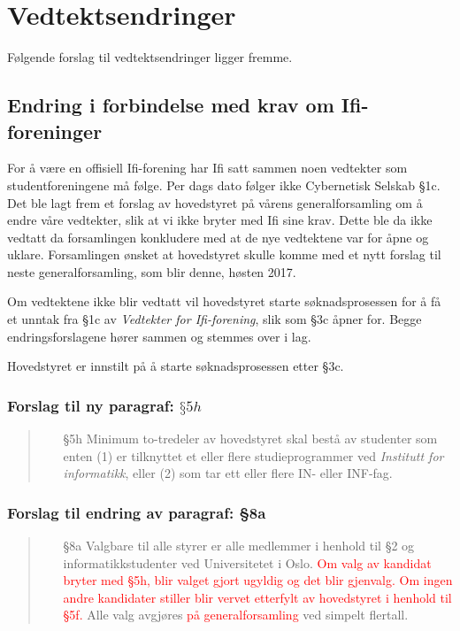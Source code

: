 \documentclass[10pt,norsk,a4paper]{article}
\begin{document}
\newpage

\section{Vedtektsendringer}
Følgende forslag til vedtektsendringer ligger fremme.

\subsection{Endring i forbindelse med krav om Ifi-foreninger}

For å være en offisiell Ifi-forening har Ifi satt sammen noen vedtekter som studentforeningene må følge.
Per dags dato følger ikke Cybernetisk Selskab §1c\footnotemark. Det ble lagt frem et forslag av hovedstyret på vårens generalforsamling om å endre våre vedtekter, slik at vi ikke bryter med Ifi sine krav.
Dette ble da ikke vedtatt da forsamlingen konkludere med at de nye vedtektene var for åpne og uklare. Forsamlingen ønsket at hovedstyret skulle komme med et nytt forslag til neste generalforsamling, som blir denne, høsten 2017.


Om vedtektene ikke blir vedtatt vil hovedstyret starte søknadsprosessen for å få et unntak fra §1c av \textit{Vedtekter for Ifi-forening}, slik som §3c åpner for. Begge endringsforslagene hører sammen og stemmes over i lag.

Hovedstyret er innstilt på å starte søknadsprosessen etter §3c.

\subsubsection{Forslag til ny paragraf: $§5h$}
\begin{quote}
	\begin{enumerate}
		\item[§5h] Minimum to-tredeler av hovedstyret skal bestå av studenter som enten (1) er tilknyttet et eller flere studieprogrammer ved \textit{Institutt for informatikk}, eller (2) som tar ett eller flere IN- eller INF-fag.
	\end{enumerate}
\end{quote}

\subsubsection{Forslag til endring av paragraf: §8a}
\begin{quote}
	\begin{enumerate}
		\item[§8a]
			Valgbare til alle styrer er alle medlemmer i henhold til §2 og informatikkstudenter ved Universitetet i Oslo. \textcolor{red}{Om valg av kandidat bryter med §5h, blir valget gjort ugyldig og det blir gjenvalg. Om ingen andre kandidater stiller blir vervet etterfylt av hovedstyret i henhold til §5f.} Alle valg avgjøres \textcolor{red}{på generalforsamling} ved simpelt flertall.
	\end{enumerate}
\end{quote}
\end{document}
